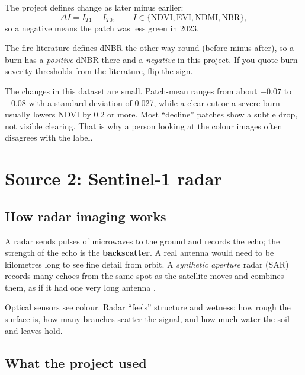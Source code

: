 The project defines change as later minus earlier:
\begin{equation}
\Delta I = I_{T1} - I_{T0}, \qquad I \in \{\mathrm{NDVI}, \mathrm{EVI}, \mathrm{NDMI}, \mathrm{NBR}\},
\label{eq:delta}
\end{equation}
so a negative \dndvi{} means the patch was less green in 2023.

\begin{watchout}
The fire literature defines dNBR the other way round (before minus after), so a burn has a \emph{positive} dNBR there \citep{keybenson2006} and a \emph{negative} \dnbr{} in this project. If you quote burn-severity thresholds from the literature, flip the sign.
\end{watchout}

\begin{plainwords}
The changes in this dataset are small. Patch-mean \dndvi{} ranges from about $-0.07$ to $+0.08$ with a standard deviation of 0.027, while a clear-cut or a severe burn usually lowers NDVI by 0.2 or more. Most ``decline'' patches show a subtle drop, not visible clearing. That is why a person looking at the colour images often disagrees with the label.
\end{plainwords}

\section{Source 2: Sentinel-1 radar}

\subsection{How radar imaging works}

A radar sends pulses of microwaves to the ground and records the echo; the strength of the echo is the \textbf{backscatter}. A real antenna would need to be kilometres long to see fine detail from orbit. A \emph{synthetic aperture} radar (SAR) records many echoes from the same spot as the satellite moves and combines them, as if it had one very long antenna \citep{woodhouse2006,floresanderson2019}.

\begin{plainwords}
Optical sensors see colour. Radar ``feels'' structure and wetness: how rough the surface is, how many branches scatter the signal, and how much water the soil and leaves hold.
\end{plainwords}

\subsection{What the project used}


